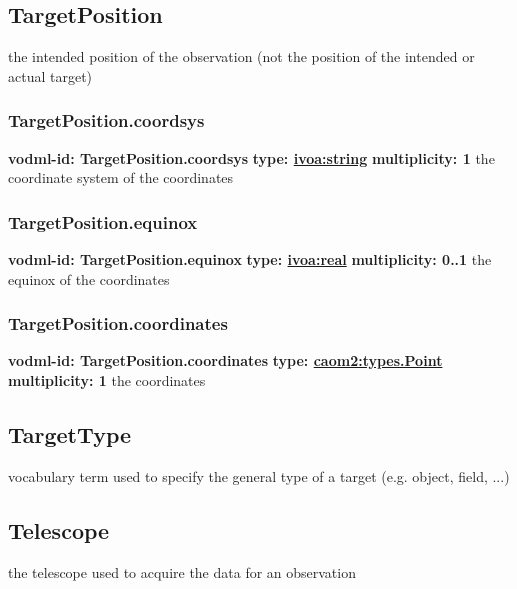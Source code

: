   \subsection{TargetPosition}
  \label{sect:TargetPosition}
    the intended position of the observation (not the position of the intended or actual target)

    \subsubsection{TargetPosition.coordsys}
      \textbf{vodml-id: TargetPosition.coordsys} \newline
      \textbf{type: \hyperref[sect:ivoa]{ivoa:string}} \newline
      \textbf{multiplicity: 1} \newline
      the coordinate system of the coordinates

    \subsubsection{TargetPosition.equinox}
      \textbf{vodml-id: TargetPosition.equinox} \newline
      \textbf{type: \hyperref[sect:ivoa]{ivoa:real}} \newline
      \textbf{multiplicity: 0..1} \newline
      the equinox of the coordinates

    \subsubsection{TargetPosition.coordinates}
      \textbf{vodml-id: TargetPosition.coordinates} \newline
      \textbf{type: \hyperref[sect:types.Point]{caom2:types.Point}} \newline
      \textbf{multiplicity: 1} \newline
      the coordinates

  \subsection{TargetType}
  \label{sect:TargetType}
    vocabulary term used to specify the general type of a target (e.g. object, field, ...)

  \subsection{Telescope}
  \label{sect:Telescope}
    the telescope used to acquire the data for an observation

